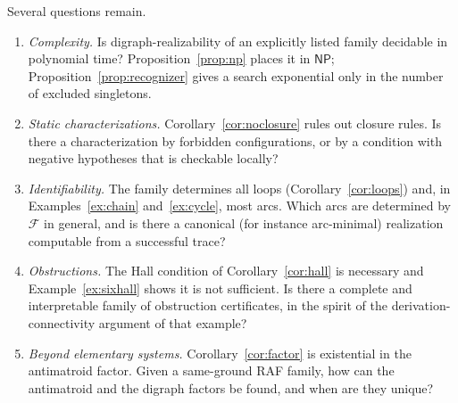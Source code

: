 \documentclass[11pt,a4paper]{article}
\theoremstyle{plain}
\theoremstyle{definition}
\theoremstyle{remark}
\newcommand{\cF}{\mathcal F}
\newcommand{\NP}{\mathsf{NP}}
\begin{document}
Several questions remain.
\begin{enumerate}
\item \emph{Complexity.} Is digraph-realizability of an explicitly listed family decidable in polynomial time? Proposition~\ref{prop:np} places it in $\NP$; Proposition~\ref{prop:recognizer} gives a search exponential only in the number of excluded singletons.
\item \emph{Static characterizations.} Corollary~\ref{cor:noclosure} rules out closure rules. Is there a characterization by forbidden configurations, or by a condition with negative hypotheses that is checkable locally?
\item \emph{Identifiability.} The family determines all loops (Corollary~\ref{cor:loops}) and, in Examples~\ref{ex:chain} and~\ref{ex:cycle}, most arcs. Which arcs are determined by $\cF$ in general, and is there a canonical (for instance arc-minimal) realization computable from a successful trace?
\item \emph{Obstructions.} The Hall condition of Corollary~\ref{cor:hall} is necessary and Example~\ref{ex:sixhall} shows it is not sufficient. Is there a complete and interpretable family of obstruction certificates, in the spirit of the derivation-connectivity argument of that example?
\item \emph{Beyond elementary systems.} Corollary~\ref{cor:factor} is existential in the antimatroid factor. Given a same-ground RAF family, how can the antimatroid and the digraph factors be found, and when are they unique?
\end{enumerate}



\end{document}
